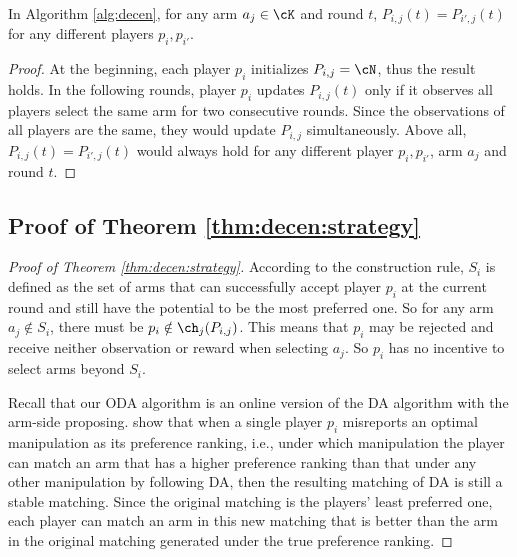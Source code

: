 \begin{lemma}\label{lem:decen:sameP}
In Algorithm \ref{alg:decen}, for any arm $a_j\in \cK$ and round $t$, $P_{i,j}(t) = P_{i',j}(t)$ for any different players $p_i,p_{i'}$. 
\end{lemma}
\begin{proof} 

At the beginning, each player $p_i$ initializes $P_{i,j}=\cN$, thus the result holds. In the following rounds, player $p_i$ updates $P_{i,j}(t)$ only if it observes all players select the same arm for two consecutive rounds. Since the observations of all players are the same, they would update $P_{i,j}$ simultaneously. Above all, $P_{i,j}(t) = P_{i',j}(t)$ would always hold for any different player $p_i,p_{i'}$, arm $a_j$ and round $t$. 


\end{proof}




\subsection{Proof of Theorem \ref{thm:decen:strategy}}


\begin{proof}[Proof of Theorem \ref{thm:decen:strategy}]
According to the construction rule, $S_i$ is defined as the set of arms that can successfully accept player $p_i$ at the current round and still have the potential to be the most preferred one. 
So for any arm $a_j \notin S_i$, there must be $p_i \notin \ch_j(P_{i,j})$.  
This means that $p_i$ may be rejected and receive neither observation or reward when selecting $a_j$. So $p_i$ has no incentive to select arms beyond $S_i$. 

  
Recall that our ODA algorithm is an online version of the DA algorithm with the arm-side proposing. \citet[Theorem 3]{vaish2017manipulating} show that when a single player $p_i$ misreports an optimal manipulation as its preference ranking, i.e., under which manipulation the player can match an arm that has a higher preference ranking than that under any other manipulation by following DA, then the resulting matching of DA is still a stable matching. Since the original matching is the players' least preferred one, each player can match an arm in this new matching that is better than the arm in the original matching generated under the true preference ranking. 

  
\end{proof}








